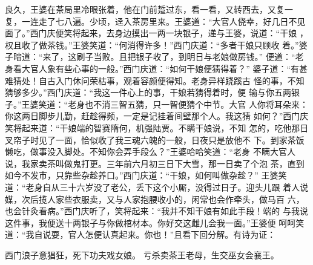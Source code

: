 良久，王婆在茶局里冷眼张着，他在门前踅过东，看一看，又转西去，又复一
复，一连走了七八遍。少顷，迳入茶房里来。王婆道：“大官人侥幸，好几日不见
面了。”西门庆便笑将起来，去身边摸出一两一块银子，递与王婆，说道：“干娘
，权且收了做茶钱。”王婆笑道：“何消得许多！”西门庆道：“多者干娘只顾收
着。”婆子暗道：“来了，这刷子当败。且把银子收了，到明日与老娘做房钱。”
便道：“老身看大官人象有些心事的一般。”西门庆道：“如何干娘便猜得着？”
婆子道：“有甚难猜处！自古入门休问荣枯事，观着容颜便得知。老身异样跷蹊古
怪的事，不知猜够多少。”西门庆道：“我这一件心上的事，干娘若猜得着时，便
输与你五两银子。”王婆笑道：“老身也不消三智五猜，只一智便猜个中节。大官
人你将耳朵来：你这两日脚步儿勤，赶趁得频，一定是记挂着间壁那个人。我这猜
如何？”西门庆笑将起来道：“干娘端的智赛隋何，机强陆贾。不瞒干娘说，不知
怎的，吃他那日叉帘子时见了一面，恰似收了我三魂六魄的一般，日夜只是放他不
下。到家茶饭懒吃，做事没入脚处。不知你会弄手段么？”王婆哈哈笑道：“老身
不瞒大官人说，我家卖茶叫做鬼打更。三年前六月初三日下大雪，那一日卖了个泡
茶，直到如今不发市，只靠些杂趁养口。”西门庆道：“干娘，如何叫做杂趁？”
王婆笑道：“老身自从三十六岁没了老公，丢下这个小厮，没得过日子。迎头儿跟
着人说媒，次后揽人家些衣服卖，又与人家抱腰收小的，闲常也会作牵头，做马百
六，也会针灸看病。”西门庆听了，笑将起来：“我并不知干娘有如此手段！端的
与我说这件事，我便送十两银子与你做棺材本。你好交这雌儿会我一面。”王婆便
呵呵笑道：“我自说耍，官人怎便认真起来。你也！”且看下回分解。有诗为证：

西门浪子意猖狂，死下功夫戏女娘。
亏杀卖茶王老母，生交巫女会襄王。